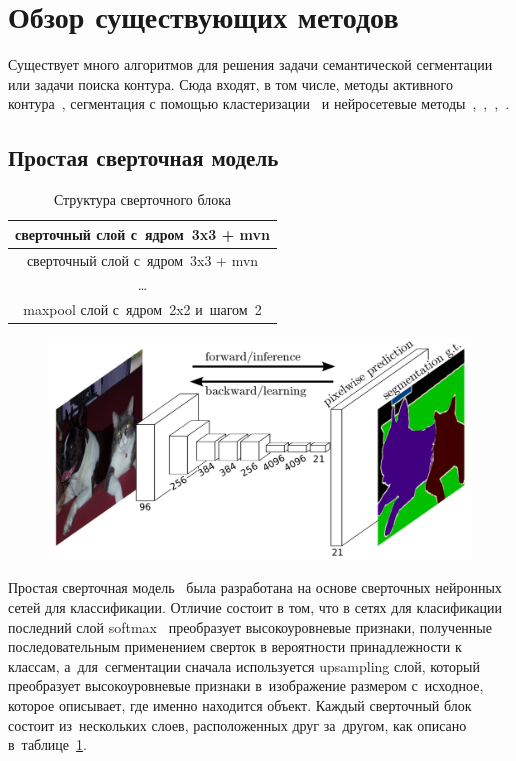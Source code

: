 \section{Обзор существующих методов}

Существует много алгоритмов для решения задачи семантической сегментации или задачи поиска контура. Сюда входят, в том числе, методы активного контура~\cite{snakes}, сегментация с помощью кластеризации~\cite{clustering_segm} и нейросетевые методы~\cite{fcn},~\cite{unet},~\cite{gridnet},~\cite{deeplab}.

\subsection{Простая сверточная модель}

\begin{table}[b]
  \begin{center}
    \caption{Структура сверточного блока} \label{tab:conv_block}
    \begin{tabular}{ c }
      \hline
      сверточный слой с~ядром~3x3 + mvn     \\ \hline
      сверточный слой с~ядром~3x3 + mvn     \\ \hline
      \dots                                 \\ \hline
      maxpool слой с~ядром~2x2 и~шагом~2    \\ 
      \hline
    \end{tabular}
  \end{center}
\end{table}

\begin{figure}[ht]
  \includegraphics[width=\textwidth,keepratio]{img/fcn_1_layer_upsample}
\end{figure}

Простая сверточная модель~\cite{fcn_1_layer_upsample} была разработана на основе сверточных нейронных сетей для классификации. Отличие состоит в том, что в сетях для класификации последний слой softmax~\cite{classification_loss} преобразует высокоуровневые признаки, полученные последовательным применением сверток в вероятности принадлежности к классам, а~для~сегментации сначала используется upsampling слой, который преобразует высокоуровневые признаки в~изображение размером с~исходное, которое описывает, где именно находится объект. Каждый сверточный блок состоит из~нескольких слоев, расположенных друг за~другом, как описано в~таблице~\ref{tab:conv_block}.


